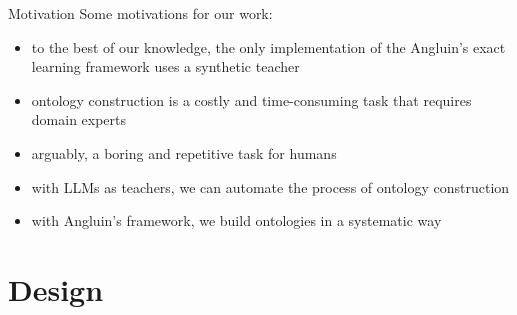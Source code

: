 \documentclass[handout]{beamer}\mode<handout>{\usetheme{AMSBolognaFC}}
\begin{document}
\begin{frame}[c]{Motivation}
    Some motivations for our work:
    \vfill
    \begin{itemize}
        \item to the best of our knowledge, the only implementation of the Angluin's exact learning framework uses a \alert{synthetic teacher} 
        \item ontology construction is a costly and time-consuming task that requires domain experts
        \item arguably, a boring and repetitive task for humans
        \item with LLMs as teachers, we can \alert{automate} the process of ontology construction
        \item with Angluin's framework, we build ontologies in a systematic way
    \end{itemize}
\end{frame}


\section{Design}
\end{document}
